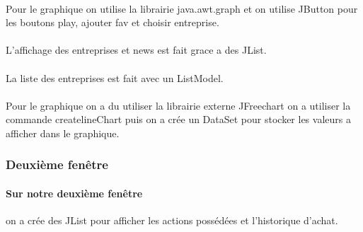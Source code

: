 \paragraph{} Pour le graphique on utilise la librairie java.awt.graph et on utilise JButton pour les boutons play, ajouter fav et choisir entreprise.
\paragraph{} L'affichage des entreprises et news est fait grace a des JList.
\paragraph{}La liste des entreprises est fait avec un ListModel.

\paragraph{} Pour le graphique on a du utiliser la librairie externe JFreechart on a utiliser la commande createlineChart puis on a crée un DataSet pour stocker les valeurs a afficher dans le graphique.





\paragraph{} 
\paragraph{} 
\paragraph{} 

\subsubsection{Deuxième fenêtre}
\paragraph{Sur notre deuxième fenêtre}on a crée des JList pour afficher les actions possédées et l'historique d'achat.
